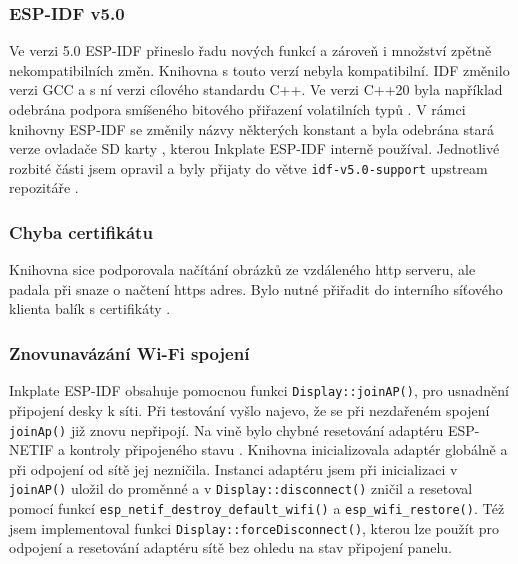 \subsubsection{ESP-IDF v5.0} Ve verzi 5.0 ESP-IDF přineslo řadu nových funkcí a zároveň i množství zpětně nekompatibilních změn. Knihovna s touto verzí nebyla kompatibilní. IDF změnilo verzi GCC a s ní verzi cílového standardu C++. Ve verzi C++20 byla například odebrána podpora smíšeného bitového přiřazení volatilních typů \cite{jtcDedeprecatingVolatileCompound}. V rámci knihovny ESP-IDF se změnily názvy některých konstant\cite{PeripheralsESP32S2ESPIDF} a byla odebrána stará verze ovladače SD karty \cite{StorageESP32S2ESPIDF}, kterou Inkplate ESP-IDF interně používal. Jednotlivé rozbité části jsem opravil a byly přijaty do větve \verb|idf-v5.0-support| upstream repozitáře \cite{WIPInitialSupport}. 

\subsubsection{Chyba certifikátu} Knihovna sice podporovala načítání obrázků ze vzdáleného http serveru, ale padala při snaze o načtení https adres. Bylo nutné přiřadit do interního síťového klienta balík s certifikáty \cite{MenuconfigVariantSelection}.

\subsubsection{Znovunavázání Wi-Fi spojení} Inkplate ESP-IDF obsahuje pomocnou funkci \lstinline|Display::joinAP()|, pro usnadnění připojení desky k síti. Při testování vyšlo najevo, že se při nezdařeném spojení \lstinline|joinAp()| již znovu nepřipojí. Na vině bylo chybné resetování adaptéru ESP-NETIF a kontroly připojeného stavu \cite{MenuconfigVariantSelection}. Knihovna inicializovala adaptér globálně a při odpojení od sítě jej nezničila. Instanci adaptéru jsem při inicializaci v \lstinline|joinAP()| uložil do proměnné a v \lstinline|Display::disconnect()| zničil a resetoval pomocí funkcí \lstinline|esp_netif_destroy_default_wifi()| a \lstinline|esp_wifi_restore()|\cite{FixedAPReconnection}. Též jsem implementoval funkci \lstinline|Display::forceDisconnect()|, kterou lze použít pro odpojení a resetování adaptéru sítě bez ohledu na stav připojení panelu\cite{FixedInvalidState}.

